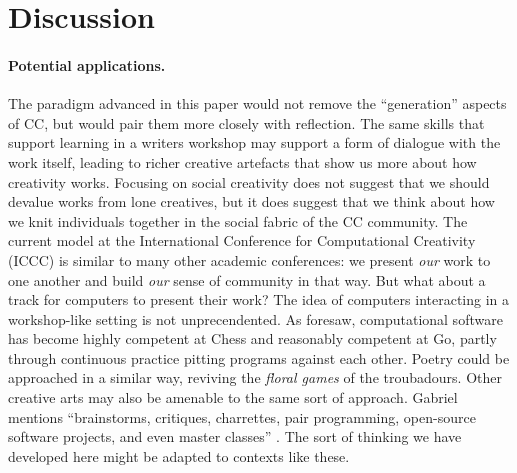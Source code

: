 \section{Discussion} \label{sec:discussion}

\paragraph{Potential applications.}
The paradigm advanced in this paper would not remove the ``generation''
aspects of CC, but would pair them more closely with
reflection. The same skills that
support learning in a writers workshop may support a form of dialogue
with the work itself, leading to richer creative artefacts that show
us more about how creativity works.
%
%
Focusing on social creativity does not suggest that we should
devalue works from lone creatives, but it does suggest that we think
about how we knit individuals together in the social fabric of the CC
community.  The current model at the International Conference for
Computational Creativity (ICCC) is similar to many other academic
conferences: 
we present \emph{our} work to
one another and build \emph{our} sense of community in that way. But
what about a track for computers to present their work?
%
The idea of computers interacting in a workshop-like setting is not unprecendented.
As \citet{turing-intelligent} foresaw, computational software has become highly competent
at Chess and reasonably competent at Go, partly through continuous practice pitting programs against each other.
Poetry could be approached in a similar way, reviving the \emph{floral games} of the troubadours.
Other creative arts may also be amenable to the same sort of approach.  Gabriel mentions
``brainstorms, critiques, charrettes, pair programming, open-source software projects, and
even master classes'' \cite[p. 11]{gabriel2002writer}.  The sort of thinking we
have developed here might be adapted to contexts like these.

